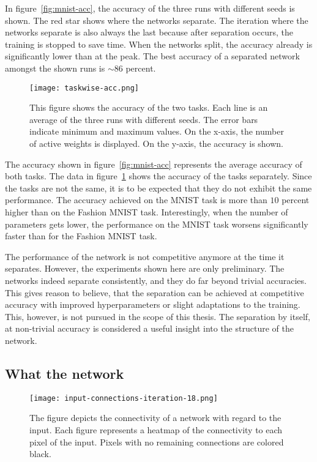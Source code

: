 In figure~\ref{fig:mnist-acc}, the accuracy of the three runs with different seeds is shown.
The red star shows where the networks separate.
The iteration where the networks separate is also always the last because after separation occurs, the training is stopped to save time.
When the networks split, the accuracy already is significantly lower than at the peak.
The best accuracy of a separated network amongst the shown runs is $\sim86$ percent.

\begin{figure}[ht]
    \centering
    \texttt{[image: taskwise-acc.png]}
    \caption{
        This figure shows the accuracy of the two tasks.
        Each line is an average of the three runs with different seeds.
        The error bars indicate minimum and maximum values.
        On the x-axis, the number of active weights is displayed.
        On the y-axis, the accuracy is shown.
    }\label{fig:taskwise-acc}
\end{figure}

The accuracy shown in figure~\ref{fig:mnist-acc} represents the average accuracy of both tasks.
The data in figure~\ref{fig:taskwise-acc} shows the accuracy of the tasks separately.
Since the tasks are not the same, it is to be expected that they do not exhibit the same performance.
The accuracy achieved on the MNIST task is more than $10$ percent higher than on the Fashion MNIST task.
Interestingly, when the number of parameters gets lower, the performance on the MNIST task worsens significantly faster than for the Fashion MNIST task.

The performance of the network is not competitive anymore at the time it separates.
However, the experiments shown here are only preliminary.
The networks indeed separate consistently, and they do far beyond trivial accuracies.
This gives reason to believe, that the separation can be achieved at competitive accuracy with improved hyperparameters or slight adaptations to the training.
This, however, is not pursued in the scope of this thesis.
The separation by itself, at non-trivial accuracy is considered a useful insight into the structure of the network.

\subsection{What the network }

\begin{figure}[ht]
    \centering
    \texttt{[image: input-connections-iteration-18.png]}
    \caption{
        The figure depicts the connectivity of a network with regard to the input.
        Each figure represents a heatmap of the connectivity to each pixel of the input.
        Pixels with no remaining connections are colored black.
    }\label{fig:input-heatmap}
\end{figure}

